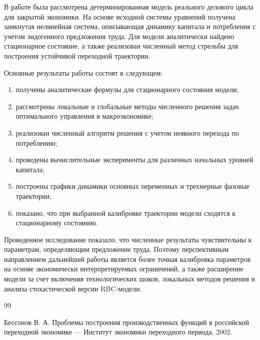 \documentclass[14pt,a4paper]{extreport}
\begin{document}
    В работе была рассмотрена детерминированная модель реального делового цикла для закрытой экономики. На основе исходной системы уравнений получена замкнутая нелинейная система, описывающая динамику капитала и потребления с учетом эндогенного предложения труда. Для модели аналитически найдено стационарное состояние, а также реализован численный метод стрельбы для построения устойчивой переходной траектории.

    Основные результаты работы состоят в следующем:
    \begin{enumerate}[label=\arabic*)]
        \item получены аналитические формулы для стационарного состояния модели;
        \item рассмотрены локальные и глобальные методы численного решения задач оптимального управления в макроэкономике;
        \item реализован численный алгоритм решения с учетом неявного перехода по потреблению;
        \item проведены вычислительные эксперименты для различных начальных уровней капитала;
        \item построены графики динамики основных переменных и трехмерные фазовые траектории;
        \item показано, что при выбранной калибровке траектории модели сходятся к стационарному состоянию.
    \end{enumerate}

    Проведенное исследование показало, что численные результаты чувствительны к параметрам, определяющим предложение труда. Поэтому перспективным направлением дальнейшей работы является более точная калибровка параметров на основе экономически интерпретируемых ограничений, а также расширение модели за счет включения технологических шоков, локальных методов решения и анализа стохастической версии RBC-модели.

    \clearpage
{}
{}
    \begin{thebibliography}{99}

    Бессонов В. А. Проблемы построения производственных функций в российской переходной экономике --- Институт экономики переходного периода, 2002.






    \end{thebibliography}
\end{document}
